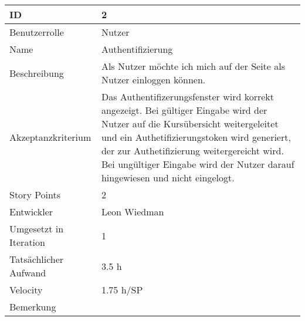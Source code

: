 \begin{tabularx}{\textwidth}{|p{}|X|}
	\hline
	ID & 2\\
	\hline
	Benutzerrolle & Nutzer\\
	\hline
	Name & Authentifizierung\\
	\hline
	Beschreibung & Als Nutzer möchte ich mich auf der Seite als Nutzer einloggen können.\\
	\hline
	Akzeptanzkriterium & Das Authentifizerungsfenster wird korrekt angezeigt. Bei gültiger Eingabe wird der Nutzer auf die Kursübersicht weitergeleitet und ein Authetifizierungstoken wird generiert, der zur Authetifizierung weitergereicht wird. Bei ungültiger Eingabe wird der Nutzer darauf hingewiesen und nicht eingelogt.\\
	\hline
	Story Points & 2 \\
	\hline
	Entwickler & Leon Wiedman\\
	\hline
	Umgesetzt in Iteration & 1\\
	\hline
	Tatsächlicher Aufwand & 3.5 h\\
	\hline
	Velocity & 1.75 h/SP\\
	\hline
	Bemerkung & \\
	\hline
\end{tabularx}
\vspace{20pt}
